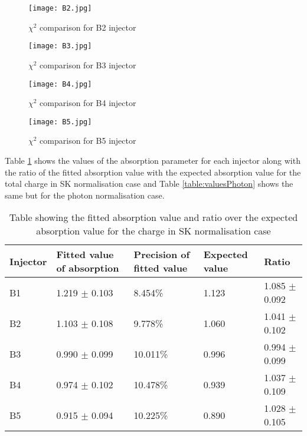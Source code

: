 \documentclass[11pt,oneside,a4paper]{article}
\begin{document}
\begin{figure}[htbp]
	\centering
	\texttt{[image: B2.jpg]}
	\caption{$\chi^{2}$ comparison for B2 injector}
	\label{fig:B2}
\end{figure}


\begin{figure}[htbp]
	\centering
	\texttt{[image: B3.jpg]}
	\caption{$\chi^{2}$ comparison for B3 injector}
	\label{fig:B3}
\end{figure}	


\begin{figure}[htbp]
	\centering
	\texttt{[image: B4.jpg]}
	\caption{$\chi^{2}$ comparison for B4 injector}
	\label{fig:B4}
\end{figure}	

\begin{figure}[htbp]
	\centering
	\texttt{[image: B5.jpg]}
	\caption{$\chi^{2}$ comparison for B5 injector}
	\label{fig:B5}
\end{figure}	
	



\newpage
Table \ref{table:valuesQ} shows the values of the absorption parameter for each injector along with the ratio of the fitted absorption value with the expected absorption value for the total charge in SK normalisation case and Table \ref{table:valuesPhoton} shows the same but for the photon normalisation case. 

\begin{table}[h]
	\begin{tabular}{lllll}
	Injector	&Fitted value of absorption & Precision of fitted value & Expected value & Ratio   \\
	\hline
		B1	  	&1.219 $\pm$ 0.103         & 8.454\%                  & 1.123          & 1.085 $\pm$ 0.092 \\                   
		B2		&1.103 $\pm$ 0.108         & 9.778\%                  & 1.060          & 1.041 $\pm$ 0.102  \\               
		B3		&0.990 $\pm$ 0.099         & 10.011\%                 & 0.996          & 0.994 $\pm$ 0.099  \\               
		B4		&0.974 $\pm$ 0.102         & 10.478\%                 & 0.939          & 1.037 $\pm$ 0.109  \\               
		B5		&0.915 $\pm$ 0.094         & 10.225\%                 & 0.890          & 1.028 $\pm$ 0.105  \\              
	\end{tabular}
\caption{Table \label{table:valuesQ} showing the fitted absorption value and ratio over the expected absorption value for the charge in SK normalisation case}
\end{table}
	
\end{document}
